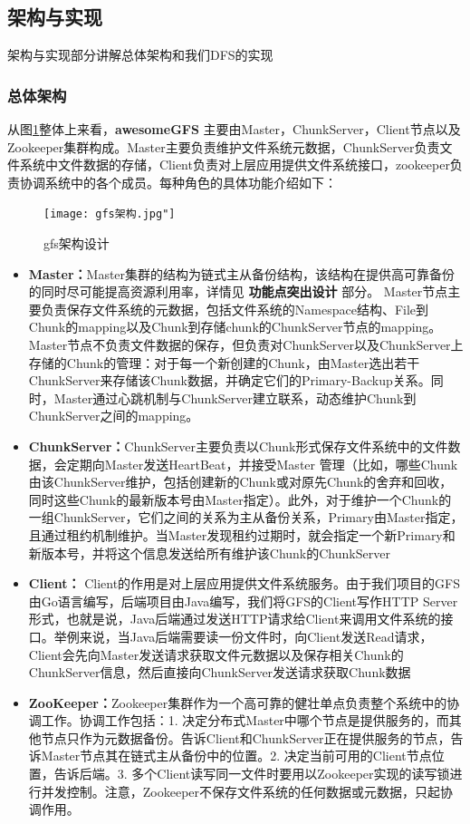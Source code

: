 \documentclass[UTF8]{ctexart}
\begin{document}
\subsection{架构与实现}
架构与实现部分讲解总体架构和我们DFS的实现
\subsubsection{总体架构}
从图\ref{fig:gfs架构设计}整体上来看，\textbf{awesomeGFS} 主要由Master，ChunkServer，Client节点以及Zookeeper集群构成。Master主要负责维护文件系统元数据，ChunkServer负责文件系统中文件数据的存储，Client负责对上层应用提供文件系统接口，zookeeper负责协调系统中的各个成员。每种角色的具体功能介绍如下：
\begin{figure}[h]
    \centering
    \texttt{[image: gfs架构.jpg"]}
	\caption{gfs架构设计}
	\label{fig:gfs架构设计}
\end{figure}
\begin{itemize}
\item \textbf{Master：}Master集群的结构为链式主从备份结构，该结构在提供高可靠备份的同时尽可能提高资源利用率，详情见 \textbf{功能点突出设计} 部分。 Master节点主要负责保存文件系统的元数据，包括文件系统的Namespace结构、File到Chunk的mapping以及Chunk到存储chunk的ChunkServer节点的mapping。Master节点不负责文件数据的保存，但负责对ChunkServer以及ChunkServer上存储的Chunk的管理：对于每一个新创建的Chunk，由Master选出若干ChunkServer来存储该Chunk数据，并确定它们的Primary-Backup关系。同时，Master通过心跳机制与ChunkServer建立联系，动态维护Chunk到ChunkServer之间的mapping。
\item \textbf{ChunkServer：}ChunkServer主要负责以Chunk形式保存文件系统中的文件数据，会定期向Master发送HeartBeat，并接受Master 管理（比如，哪些Chunk由该ChunkServer维护，包括创建新的Chunk或对原先Chunk的舍弃和回收，同时这些Chunk的最新版本号由Master指定）。此外，对于维护一个Chunk的一组ChunkServer，它们之间的关系为主从备份关系，Primary由Master指定，且通过租约机制维护。当Master发现租约过期时，就会指定一个新Primary和新版本号，并将这个信息发送给所有维护该Chunk的ChunkServer
\item \textbf{Client：} Client的作用是对上层应用提供文件系统服务。由于我们项目的GFS由Go语言编写，后端项目由Java编写，我们将GFS的Client写作HTTP Server形式，也就是说，Java后端通过发送HTTP请求给Client来调用文件系统的接口。举例来说，当Java后端需要读一份文件时，向Client发送Read请求，Client会先向Master发送请求获取文件元数据以及保存相关Chunk的ChunkServer信息，然后直接向ChunkServer发送请求获取Chunk数据
\item \textbf{ZooKeeper：}Zookeeper集群作为一个高可靠的健壮单点负责整个系统中的协调工作。协调工作包括：1. 决定分布式Master中哪个节点是提供服务的，而其他节点只作为元数据备份。告诉Client和ChunkServer正在提供服务的节点，告诉Master节点其在链式主从备份中的位置。2. 决定当前可用的Client节点位置，告诉后端。3. 多个Client读写同一文件时要用以Zookeeper实现的读写锁进行并发控制。注意，Zookeeper不保存文件系统的任何数据或元数据，只起协调作用。
\end{itemize}
\end{document}
